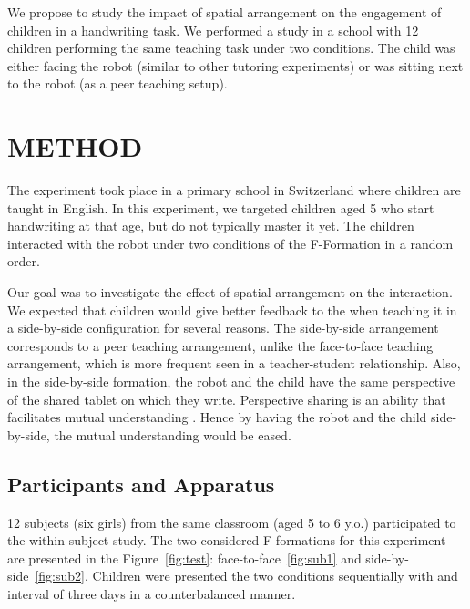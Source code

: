 \documentclass[letterpaper, 10 pt, conference]{ieeeconf}  %
\begin{document}
We propose to study the impact of spatial arrangement on the engagement of children in a handwriting task.
We performed a study in a school with 12 children performing the same teaching task under two conditions.
The child was either facing the robot (similar to other tutoring experiments) or was sitting next to the robot (as a peer teaching setup).





\section{METHOD}
The experiment took place in a primary school in Switzerland where children are taught in English.
In this experiment, we targeted children aged 5 who start handwriting at that age, but do not typically master it yet.
The children interacted with the robot under two conditions of the F-Formation in a random order.

Our goal was to investigate the effect of spatial arrangement on the interaction.
We expected that children would give better feedback to the
when teaching it in a side-by-side configuration for several reasons.
The side-by-side arrangement corresponds to a peer teaching arrangement, unlike the face-to-face teaching arrangement, which is more frequent seen in a teacher-student relationship.
Also, in the side-by-side formation, the robot and the child have the same perspective of the shared tablet on which they write.
Perspective sharing is an ability that facilitates mutual understanding \cite{berlin2006perspective}.
Hence by having the robot and the child side-by-side, the mutual understanding would be eased.

\subsection{Participants and Apparatus}
12 subjects (six girls) from the same classroom (aged 5 to 6 y.o.) participated to the within subject study.
The two considered F-formations for this experiment are presented in the Figure~\ref{fig:test}: face-to-face~\ref{fig:sub1} and side-by-side~\ref{fig:sub2}.
Children were presented the two conditions sequentially with and interval of three days in a counterbalanced manner.
\end{document}
